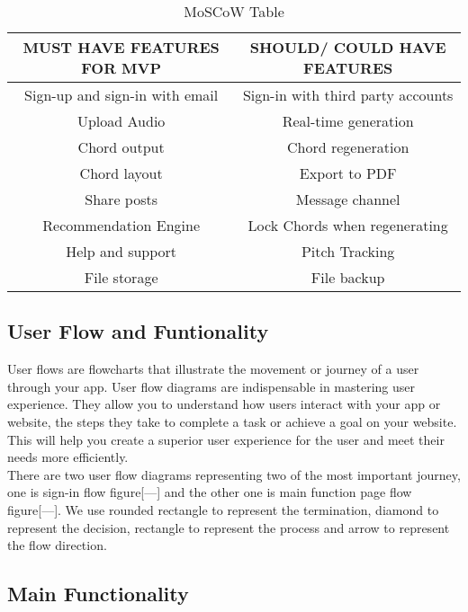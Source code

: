 \begin{table}[ht]
\centering
\begin{tabular}{ |c|c| } 
 \hline
\textbf{MUST HAVE FEATURES FOR MVP} & \textbf{SHOULD/ COULD HAVE FEATURES}\\ 
 \hline
 Sign-up and sign-in with email & Sign-in with third party accounts \\ 
 \hline
 Upload Audio & Real-time generation \\ 
 \hline
 Chord output & Chord regeneration \\ 
 \hline
 Chord layout &  Export to PDF \\ 
 \hline
 Share posts & Message channel \\ 
 \hline
 Recommendation Engine &  Lock Chords when regenerating\\ 
 \hline
 Help and support &  Pitch Tracking\\ 
 \hline
 File storage& File backup \\ 
 \hline
 \end{tabular}
 \caption{MoSCoW Table}
 \centering
 \end{table}
 
 \subsection{User Flow and Funtionality}
User flows are flowcharts that illustrate the movement or journey of a user through your app. User flow diagrams are indispensable in mastering user experience. They allow you to understand how users interact with your app or website, the steps they take to complete a task or achieve a goal on your website. This will help you create a superior user experience for the user and meet their needs more efficiently.  
\\There are two user flow diagrams representing two of the most important journey, one is sign-in flow figure[---] and the other one is main function page flow figure[---]. We use rounded rectangle to represent the termination, diamond to represent the decision, rectangle to represent the process and arrow to represent the flow direction.



\subsection*{Main Functionality}

